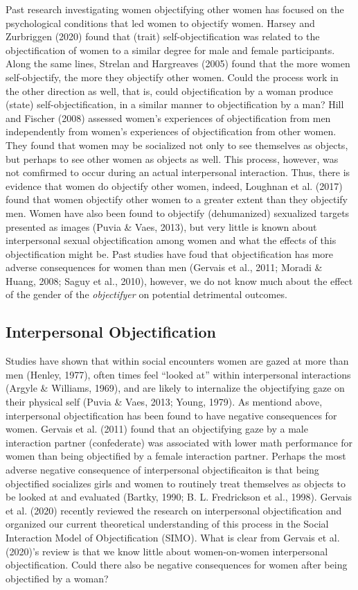 \documentclass[man]{apa6}
\begin{document}
Past research investigating women objectifying other women has focused
on the psychological conditions that led women to objectify women.
Harsey and Zurbriggen (2020) found that (trait) self-objectification was
related to the objectification of women to a similar degree for male and
female participants. Along the same lines, Strelan and Hargreaves (2005)
found that the more women self-objectify, the more they objectify other
women. Could the process work in the other direction as well, that is,
could objectification by a woman produce (state) self-objectification,
in a similar manner to objectification by a man? Hill and Fischer (2008)
assessed women's experiences of objectification from men independently
from women's experiences of objectification from other women. They found
that women may be socialized not only to see themselves as objects, but
perhaps to see other women as objects as well. This process, however,
was not comfirmed to occur during an actual interpersonal interaction.
Thus, there is evidence that women do objectify other women, indeed,
Loughnan et al. (2017) found that women objectify other women to a
greater extent than they objectify men. Women have also been found to
objectify (dehumanized) sexualized targets presented as images (Puvia \&
Vaes, 2013), but very little is known about interpersonal sexual
objectification among women and what the effects of this objectification
might be. Past studies have foud that objectification has more adverse
consequences for women than men (Gervais et al., 2011; Moradi \& Huang,
2008; Saguy et al., 2010), however, we do not know much about the effect
of the gender of the \emph{objectifyer} on potential detrimental
outcomes.

\subsection{Interpersonal
Objectification}\label{interpersonal-objectification}

Studies have shown that within social encounters women are gazed at more
than men (Henley, 1977), often times feel \enquote{looked at} within
interpersonal interactions (Argyle \& Williams, 1969), and are likely to
internalize the objectifying gaze on their physical self (Puvia \& Vaes,
2013; Young, 1979). As mentiond above, interpersonal objectification has
been found to have negative consequences for women. Gervais et al.
(2011) found that an objectifying gaze by a male interaction partner
(confederate) was associated with lower math performance for women than
being objectified by a female interaction partner. Perhaps the most
adverse negative consequence of interpersonal objectificaiton is that
being objectified socializes girls and women to routinely treat
themselves as objects to be looked at and evaluated (Bartky, 1990; B. L.
Fredrickson et al., 1998). Gervais et al. (2020) recently reviewed the
research on interpersonal objectification and organized our current
theoretical understanding of this process in the Social Interaction
Model of Objectification (SIMO). What is clear from Gervais et al.
(2020)'s review is that we know little about women-on-women
interpersonal objectification. Could there also be negative consequences
for women after being objectified by a woman?
\end{document}
